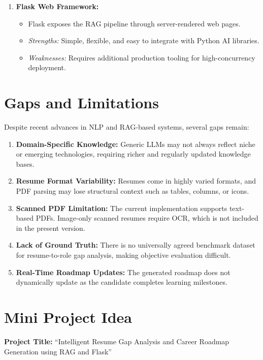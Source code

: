 \documentclass[12pt,a4paper]{report}
\begin{document}
\begin{enumerate}
  \item \textbf{Flask Web Framework:}
  \begin{itemize}
    \item Flask exposes the RAG pipeline through server-rendered web pages.
    \item \textit{Strengths:} Simple, flexible, and easy to integrate with Python
          AI libraries.
    \item \textit{Weaknesses:} Requires additional production tooling for
          high-concurrency deployment.
  \end{itemize}
\end{enumerate}

\section{Gaps and Limitations}

Despite recent advances in NLP and RAG-based systems, several gaps remain:

\begin{enumerate}
  \item \textbf{Domain-Specific Knowledge:} Generic LLMs may not always reflect
        niche or emerging technologies, requiring richer and regularly updated
        knowledge bases.
  \item \textbf{Resume Format Variability:} Resumes come in highly varied
        formats, and PDF parsing may lose structural context such as tables,
        columns, or icons.
  \item \textbf{Scanned PDF Limitation:} The current implementation supports
        text-based PDFs. Image-only scanned resumes require OCR, which is not
        included in the present version.
  \item \textbf{Lack of Ground Truth:} There is no universally agreed benchmark
        dataset for resume-to-role gap analysis, making objective evaluation
        difficult.
  \item \textbf{Real-Time Roadmap Updates:} The generated roadmap does not
        dynamically update as the candidate completes learning milestones.
\end{enumerate}

\section{Mini Project Idea}

\textbf{Project Title:} ``Intelligent Resume Gap Analysis and Career Roadmap
Generation using RAG and Flask''
\end{document}
